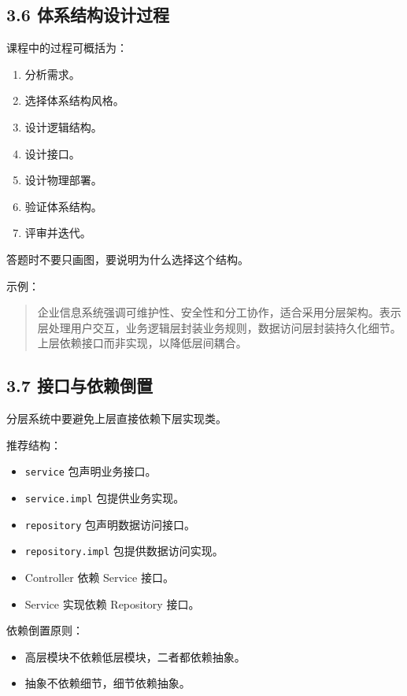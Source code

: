 \documentclass[UTF8,zihao=-4]{ctexart}
\begin{document}
\subsection{3.6 体系结构设计过程}

课程中的过程可概括为：

\begin{enumerate}
\item 分析需求。
\item 选择体系结构风格。
\item 设计逻辑结构。
\item 设计接口。
\item 设计物理部署。
\item 验证体系结构。
\item 评审并迭代。
\end{enumerate}

答题时不要只画图，要说明为什么选择这个结构。

示例：

\begin{quote}
企业信息系统强调可维护性、安全性和分工协作，适合采用分层架构。表示层处理用户交互，业务逻辑层封装业务规则，数据访问层封装持久化细节。上层依赖接口而非实现，以降低层间耦合。
\end{quote}

\subsection{3.7 接口与依赖倒置}

分层系统中要避免上层直接依赖下层实现类。

推荐结构：

\begin{itemize}
\item \texttt{service} 包声明业务接口。
\item \texttt{service.impl} 包提供业务实现。
\item \texttt{repository} 包声明数据访问接口。
\item \texttt{repository.impl} 包提供数据访问实现。
\item Controller 依赖 Service 接口。
\item Service 实现依赖 Repository 接口。
\end{itemize}

依赖倒置原则：

\begin{itemize}
\item 高层模块不依赖低层模块，二者都依赖抽象。
\item 抽象不依赖细节，细节依赖抽象。
\end{itemize}
\end{document}
